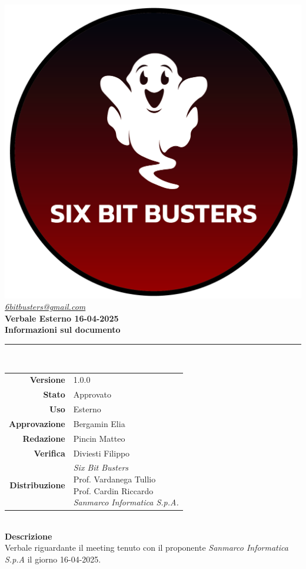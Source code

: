 \thispagestyle{empty}
\renewcommand{\arraystretch}{1.3}


\begin{titlepage}
	\begin{center}
		
	\includegraphics[scale = 0.7]{template/images/logo-circle.png}
	\\[1cm]
	\href{mailto:6bitbusters@gmail.com}		      	
	{\large{\textit{6bitbusters@gmail.com} } }\\[1cm]
	
	\Huge \textbf{Verbale Esterno 16-04-2025} \\[1cm]

	\large \textbf{Informazioni sul documento} \\
	\rule{0.6\textwidth}{0.4pt}
	\\[0.5cm]
	\begin{tabular}{r|l}
		\textbf{Versione} & 1.0.0\\
		\textbf{Stato} & Approvato\\
		\textbf{Uso} & Esterno\\                         
		\textbf{Approvazione} & Bergamin Elia\\                      
		\textbf{Redazione} & Pincin Matteo\\ 
		\textbf{Verifica} & Diviesti Filippo\\                         
		\textbf{Distribuzione} & \parbox[t]{6cm}{ \textit{Six Bit Busters} \\ Prof. Vardanega Tullio 
	 \\ Prof. Cardin Riccardo \\ \textit{Sanmarco Informatica S.p.A.}} 
	\end{tabular}	
	\\[1.2cm]

	\large \textbf{Descrizione} \\
	Verbale riguardante il meeting tenuto con il proponente \textit{Sanmarco Informatica S.p.A} il giorno 16-04-2025.
	
	\end{center}
\end{titlepage}
